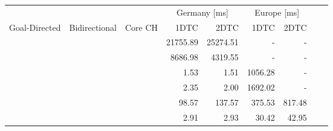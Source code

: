\begin{tabular}{cccrrrrrr}
	\toprule
	              &               &         & \multicolumn{2}{c}{Germany [\si{\milli\second}]} & \multicolumn{2}{c}{Europe [\si{\milli\second}]}               \\
	Goal-Directed & Bidirectional & Core CH & 1DTC                                             & 2DTC                                            & 1DTC & 2DTC \\
	\midrule
	\xmark        & \xmark        & \xmark  & 21755.89                                                & 25274.51                                               & -    & -    \\
	\xmark        & \cmark        & \xmark  & 8686.98                                                & 4319.55                                               & -    & -    \\
	\cmark        & \xmark        & \xmark  & 1.53                                                & 1.51                                               & 1056.28    & -    \\
	\cmark        & \cmark        & \xmark  & 2.35                                                & 2.00                                               & 1692.02    & -    \\
	\xmark        & \cmark        & \cmark  & 98.57                                                & 137.57                                               & 375.53    & 817.48    \\
	\cmark        & \cmark        & \cmark  & 2.91                                                & 2.93                                               & 30.42    & 42.95    \\
	\bottomrule
\end{tabular}